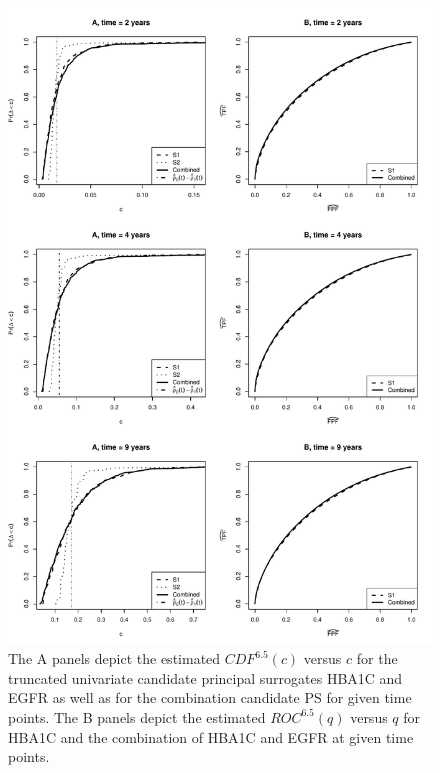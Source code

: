 \documentclass[times, 11pt]{article}
\begin{document}
\begin{figure}[H]
\begin{center}
\includegraphics[scale=0.65]{dcct-figure-supplement-new-11-18-2013.pdf}
\end{center}
\caption{The A panels depict the estimated $CDF^{6.5}(c)$ versus $c$ for the truncated univariate candidate principal surrogates HBA1C and EGFR as well as for the combination candidate PS for given time points. The B panels depict the estimated $ROC^{6.5}(q)$ versus $q$ for HBA1C and the combination of HBA1C and EGFR at given time points. \label{exp}}
\end{figure}








\end{document}
